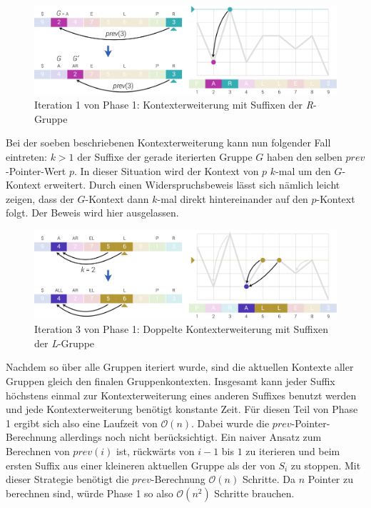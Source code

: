 \documentclass[twoside,a4paper,11pt]{article}
\theoremstyle{break}
\begin{document}
\begin{figure}[h]
	\centering
	\includegraphics[width=\linewidth,bb=0 0 1310 386]{./assets/phase1-R.pdf}
	\caption{Iteration 1 von Phase 1: Kontexterweiterung mit Suffixen der \textit{R}-Gruppe}
\label{fig:phase1-R}
\end{figure}

Bei der soeben beschriebenen Kontexterweiterung kann nun folgender Fall eintreten: $k > 1$ der Suffixe der gerade iterierten Gruppe $G$ haben den selben $prev$-Pointer-Wert $p$. In dieser Situation wird der Kontext von $p$ $k$-mal um den $G$-Kontext erweitert. Durch einen Widerspruchsbeweis lässt sich nämlich leicht zeigen, dass der $G$-Kontext dann $k$-mal direkt hintereinander auf den $p$-Kontext folgt. Der Beweis wird hier ausgelassen.

\begin{figure}[h]
	\centering
	\includegraphics[width=\linewidth,bb=0 0 1310 386]{./assets/phase1-L.pdf}
	\caption{Iteration 3 von Phase 1: Doppelte Kontexterweiterung mit Suffixen der \textit{L}-Gruppe}
\label{fig:phase1-L}
\end{figure}

Nachdem so über alle Gruppen iteriert wurde, sind die aktuellen Kontexte aller Gruppen gleich den finalen Gruppenkontexten. Insgesamt kann jeder Suffix höchstens einmal zur Kontexterweiterung eines anderen Suffixes benutzt werden und jede Kontexterweiterung benötigt konstante Zeit. Für diesen Teil von Phase 1 ergibt sich also eine Laufzeit von $\mathcal{O}(n)$. Dabei wurde die $prev$-Pointer-Berechnung allerdings noch nicht berücksichtigt. Ein naiver Ansatz zum Berechnen von $prev(i)$ ist, rückwärts von $i - 1$ bis $1$ zu iterieren und beim ersten Suffix aus einer kleineren aktuellen Gruppe als der von $S_i$ zu stoppen. Mit dieser Strategie benötigt die $prev$-Berechnung $\mathcal{O}(n)$ Schritte. Da $n$ Pointer zu berechnen sind, würde Phase 1 so also $\mathcal{O}(n^2)$ Schritte brauchen.\\
\end{document}
